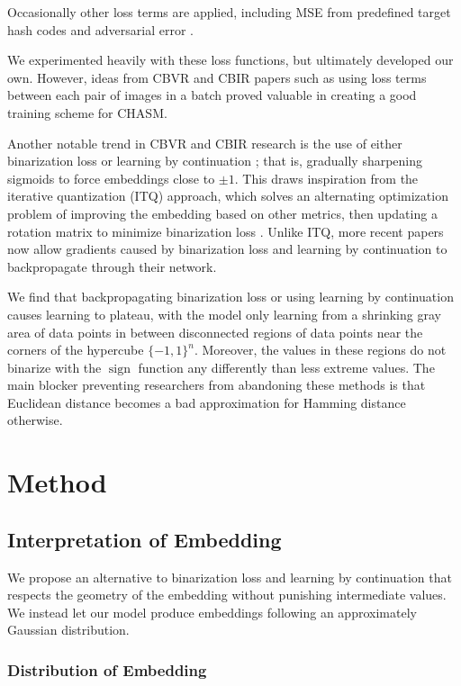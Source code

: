 \documentclass{article}
\DeclareMathOperator{\sign}{sign}
\begin{document}
\begin{multicols}{2}
Occasionally other loss terms are applied, including MSE from predefined target hash codes \cite{representation17} and adversarial error \cite{adversarial17}. 

We experimented heavily with these loss functions, but ultimately developed our own.
However, ideas from CBVR and CBIR papers such as using loss terms between each pair of images in a batch \cite{compact15} proved valuable in creating a good training scheme for CHASM.

Another notable trend in CBVR and CBIR research is the use of either binarization loss or learning by continuation \cite{hashnet17}; that is, gradually sharpening sigmoids to force embeddings close to $\pm1$.
This draws inspiration from the iterative quantization (ITQ) approach, which solves an alternating optimization problem of improving the embedding based on other metrics, then updating a rotation matrix to minimize binarization loss \cite{itq13}.
Unlike ITQ, more recent papers now allow gradients caused by binarization loss and learning by continuation to backpropagate through their network.

We find that backpropagating binarization loss or using learning by continuation causes learning to plateau, with the model only learning from a shrinking gray area of data points in between disconnected regions of data points near the corners of the hypercube $\{-1, 1\}^n$.
Moreover, the values in these regions do not binarize with the $\sign$ function any differently than less extreme values.
The main blocker preventing researchers from abandoning these methods is that Euclidean distance becomes a bad approximation for Hamming distance otherwise.


\section{Method}


\subsection{Interpretation of Embedding}

We propose an alternative to binarization loss and learning by continuation that respects the geometry of the embedding without punishing intermediate values.
We instead let our model produce embeddings following an approximately Gaussian distribution.


\subsubsection{Distribution of Embedding}


\end{multicols}
\end{document}
